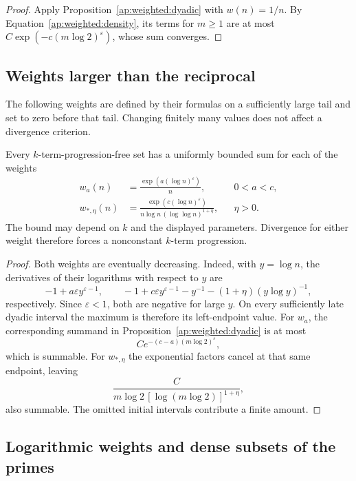\begin{proof}
Apply Proposition~\ref{ap:weighted:dyadic} with $w(n)=1/n$.
By Equation~\eqref{ap:weighted:density}, its terms for $m\ge1$ are at most
$C\exp(-c(m\log2)^\varepsilon)$, whose sum converges.
\end{proof}

\subsection{Weights larger than the reciprocal}

The following weights are defined by their formulas on a sufficiently
large tail and set to zero before that tail. Changing finitely many
values does not affect a divergence criterion.

\begin{corollary}\label{ap:weighted:stretched}
Every $k$-term-progression-free set has a uniformly bounded sum for
each of the weights
\begin{align*}
 w_a(n)&=\frac{\exp(a(\log n)^\varepsilon)}{n},
                  &&0<a<c,\\
 w_{*,\eta}(n)&=
 \frac{\exp(c(\log n)^\varepsilon)}
 {n\log n\,(\log\log n)^{1+\eta}},
                  &&\eta>0.
\end{align*}
The bound may depend on $k$ and the displayed parameters. Divergence
for either weight therefore forces a nonconstant $k$-term progression.
\end{corollary}

\begin{proof}
Both weights are eventually decreasing. Indeed, with $y=\log n$,
the derivatives of their logarithms with respect to $y$ are
\[
 -1+a\varepsilon y^{\varepsilon-1},\qquad
 -1+c\varepsilon y^{\varepsilon-1}
       -y^{-1}-(1+\eta)(y\log y)^{-1},
\]
respectively. Since $\varepsilon<1$, both are negative for large $y$.
On every sufficiently late dyadic interval the maximum is therefore
its left-endpoint value. For $w_a$, the corresponding summand in
Proposition~\ref{ap:weighted:dyadic} is at most
\[
                    C e^{-(c-a)(m\log2)^\varepsilon},
\]
which is summable. For $w_{*,\eta}$ the exponential factors cancel
at that same endpoint, leaving
\[
          \frac{C}{m\log2\,[\log(m\log2)]^{1+\eta}},
\]
also summable. The omitted initial intervals contribute a finite amount.
\end{proof}

\subsection{Logarithmic weights and dense subsets of the primes}

